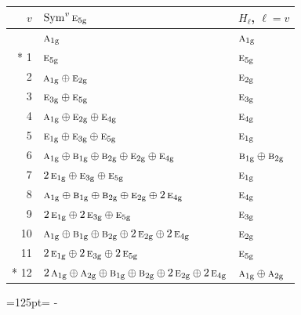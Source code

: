 \documentclass[10pt,a4paper]{article}
\newcommand{\needspace}[1]{\par\penalty-100\begingroup\dimen0=#1\relax\dimen2=\pagegoal
  \advance\dimen2-\pagetotal\ifdim\dimen0>\dimen2\relax\ifdim\dimen2>0pt\vfil\break\fi\fi
  \endgroup}
\numberwithin{equation}{section}
\newcommand{\irr}[1]{\text{\normalfont\scshape #1}}
\newcommand{\ptag}[1]{\mathrm{#1}}
\begin{document}
{\small\begin{longtable}{@{}rll@{}}\toprule
$v$ & $\operatorname{Sym}^{v}\irr{e}_{5\ptag{g}}$ & $H_\ell$, $\ell = v$\\\midrule\endhead
\bottomrule\endfoot\endlastfoot
0 & $\irr{a}_{1\ptag{g}}$ & $\irr{a}_{1\ptag{g}}$\\*
1 & $\irr{e}_{5\ptag{g}}$ & $\irr{e}_{5\ptag{g}}$\\
2 & $\irr{a}_{1\ptag{g}} \oplus \irr{e}_{2\ptag{g}}$ & $\irr{e}_{2\ptag{g}}$\\
3 & $\irr{e}_{3\ptag{g}} \oplus \irr{e}_{5\ptag{g}}$ & $\irr{e}_{3\ptag{g}}$\\
4 & $\irr{a}_{1\ptag{g}} \oplus \irr{e}_{2\ptag{g}} \oplus \irr{e}_{4\ptag{g}}$ & $\irr{e}_{4\ptag{g}}$\\
5 & $\irr{e}_{1\ptag{g}} \oplus \irr{e}_{3\ptag{g}} \oplus \irr{e}_{5\ptag{g}}$ & $\irr{e}_{1\ptag{g}}$\\
6 & $\irr{a}_{1\ptag{g}} \oplus \irr{b}_{1\ptag{g}} \oplus \irr{b}_{2\ptag{g}} \oplus \irr{e}_{2\ptag{g}} \oplus \irr{e}_{4\ptag{g}}$ & $\irr{b}_{1\ptag{g}} \oplus \irr{b}_{2\ptag{g}}$\\
7 & $2\,\irr{e}_{1\ptag{g}} \oplus \irr{e}_{3\ptag{g}} \oplus \irr{e}_{5\ptag{g}}$ & $\irr{e}_{1\ptag{g}}$\\
8 & $\irr{a}_{1\ptag{g}} \oplus \irr{b}_{1\ptag{g}} \oplus \irr{b}_{2\ptag{g}} \oplus \irr{e}_{2\ptag{g}} \oplus 2\,\irr{e}_{4\ptag{g}}$ & $\irr{e}_{4\ptag{g}}$\\
9 & $2\,\irr{e}_{1\ptag{g}} \oplus 2\,\irr{e}_{3\ptag{g}} \oplus \irr{e}_{5\ptag{g}}$ & $\irr{e}_{3\ptag{g}}$\\
10 & $\irr{a}_{1\ptag{g}} \oplus \irr{b}_{1\ptag{g}} \oplus \irr{b}_{2\ptag{g}} \oplus 2\,\irr{e}_{2\ptag{g}} \oplus 2\,\irr{e}_{4\ptag{g}}$ & $\irr{e}_{2\ptag{g}}$\\
11 & $2\,\irr{e}_{1\ptag{g}} \oplus 2\,\irr{e}_{3\ptag{g}} \oplus 2\,\irr{e}_{5\ptag{g}}$ & $\irr{e}_{5\ptag{g}}$\\*
12 & $2\,\irr{a}_{1\ptag{g}} \oplus \irr{a}_{2\ptag{g}} \oplus \irr{b}_{1\ptag{g}} \oplus \irr{b}_{2\ptag{g}} \oplus 2\,\irr{e}_{2\ptag{g}} \oplus 2\,\irr{e}_{4\ptag{g}}$ & $\irr{a}_{1\ptag{g}} \oplus \irr{a}_{2\ptag{g}}$\\
\bottomrule\end{longtable}}
\needspace{125pt}
\end{document}
